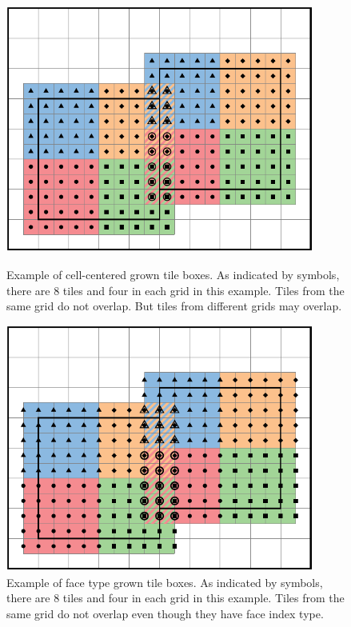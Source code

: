 {{\begin{figure}[t]
  \centering
  \begin{minipage}{0.45\textwidth}
    \centering
    \includegraphics[width=0.9\textwidth]{./Basics/cc_growbox.pdf}
    \caption{\label{fig:basics:cc_growbox} Example of cell-centered
      grown tile boxes. As indicated by symbols, there are 8 tiles and
      four in each grid in this example. Tiles from the same grid do
      not overlap.  But tiles from different grids may overlap.}
  \end{minipage}\hfill
  \begin{minipage}{0.45\textwidth}
    \centering
    \includegraphics[width=0.9\textwidth]{./Basics/ec_growbox.pdf}
    \caption{\label{fig:basics:ec_growbox} Example of face type grown
      tile boxes.   As indicated by symbols, there are 8 tiles and
      four in each grid in this example. Tiles from the same grid do
      not overlap even though they have face index type. }
  \end{minipage}
\end{figure}

}}
